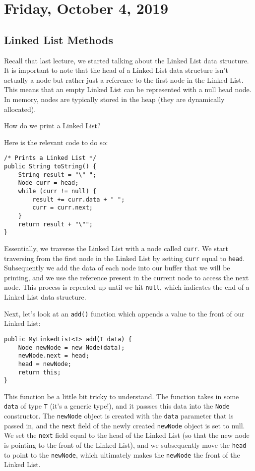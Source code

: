 \section{Friday, October 4, 2019}
\subsection{Linked List Methods}
Recall that last lecture, we started talking about the Linked List data structure. It is important to note that the head of a Linked List data structure isn't actually a node but rather just a reference to the first node in the Linked List. This means that an empty Linked List can  be represented with a null head node. In memory, nodes are typically stored in the heap (they are dynamically allocated). 

How do we print a Linked List?

Here is the relevant code to do so:

\begin{lstlisting}
/* Prints a Linked List */
public String toString() {
    String result = "\" ";
    Node curr = head;
    while (curr != null) {
        result += curr.data + " ";
        curr = curr.next;
    }
    return result + "\"";
}
\end{lstlisting}

Essentially, we traverse the Linked List with a node called \verb!curr!. We start traversing from the first node in the Linked List by setting \verb!curr! equal to \verb!head!. Subsequently we add the data of each node into our buffer that we will be printing, and we use the reference present in the current node to access the next node. This process is repeated up until we hit \verb!null!, which indicates the end of a Linked List data structure.

Next, let's look at an \verb!add()! function which appends a value to the front of our Linked List:

\begin{lstlisting}
public MyLinkedList<T> add(T data) {
    Node newNode = new Node(data);
    newNode.next = head;
    head = newNode;
    return this;
}
\end{lstlisting}

This function be a little bit tricky to understand. The function takes in some \verb!data! of type \verb!T! (it's a generic type!), and it passses this data into the \verb!Node! constructor. The \verb!newNode! object is created with the \verb!data! parameter that is passed in, and the \verb!next! field of the newly created \verb!newNode! object is set to null. We set the \verb!next! field equal to the head of the Linked List (so that the new node is pointing to the front of the Linked List), and we subsequently move the \verb!head! to point to the \verb!newNode!, which ultimately makes the \verb!newNode! the front of the Linked List. 

